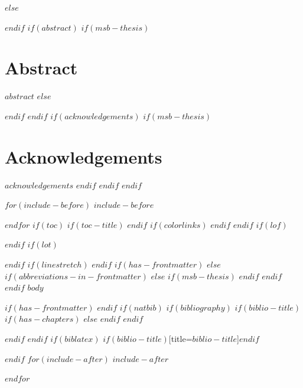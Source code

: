 \documentclass[
$if(fontsize)$
  $fontsize$,
$endif$
$if(papersize)$
  $papersize$paper,
$endif$
$for(classoption)$
  $classoption$$sep$,
$endfor$
]{$documentclass$}
\newcommand{\labelabstract}{Abstract}
\newcommand{\labelacknowledgements}{Acknowledgements}
\newcommand{\labelabstract}{Zusammenfassung}
\newcommand{\labelacknowledgements}{Danksagung}
\begin{document}
$else$
\maketitle
$endif$
$if(abstract)$
$if(msb-thesis)$
\chapter*{\labelabstract}
$abstract$
$else$
\begin{abstract}
$abstract$
\end{abstract}
$endif$
$endif$
$if(acknowledgements)$
$if(msb-thesis)$
\chapter*{\labelacknowledgements}
$acknowledgements$
$endif$
$endif$
$endif$

$for(include-before)$
$include-before$

$endfor$
$if(toc)$
$if(toc-title)$
\renewcommand*\contentsname{$toc-title$}
$endif$
{
$if(colorlinks)$
\hypersetup{linkcolor=$if(toccolor)$$toccolor$$else$$endif$}
$endif$
\setcounter{tocdepth}{$toc-depth$}
\tableofcontents
}
$endif$
$if(lof)$
\listoffigures
$endif$
$if(lot)$
\listoftables
$endif$
$if(linestretch)$
$endif$
$if(has-frontmatter)$
\mainmatter
$else$
$if(abbreviations-in-frontmatter)$
$else$
$if(msb-thesis)$
\clearpage
{}
$endif$
$endif$
$endif$
$body$

$if(has-frontmatter)$
\backmatter
$endif$
$if(natbib)$
$if(bibliography)$
$if(biblio-title)$
$if(has-chapters)$
\renewcommand\bibname{$biblio-title$}
$else$
\renewcommand\refname{$biblio-title$}
$endif$
$endif$
  

$endif$
$endif$
$if(biblatex)$
\printbibliography$if(biblio-title)$[title=$biblio-title$]$endif$

$endif$
$for(include-after)$
$include-after$

$endfor$
\end{document}
